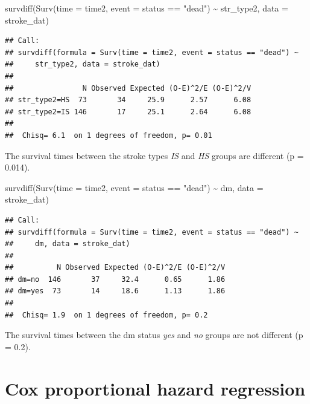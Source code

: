 \documentclass[
]{book}
\makeatletter
\newenvironment{Shaded}{\begin{snugshade}}{\end{snugshade}}
\newcommand{\AttributeTok}[1]{\textcolor[rgb]{0.61,0.61,0.61}{#1}}
\newcommand{\FunctionTok}[1]{\textcolor[rgb]{0,0,0}{#1}}
\newcommand{\NormalTok}[1]{#1}
\newcommand{\SpecialCharTok}[1]{\textcolor[rgb]{0,0,0}{#1}}
\newcommand{\StringTok}[1]{\textcolor[rgb]{0.5,0.5,0.5}{#1}}
\newenvironment{kframe}{%
\medskip{}
\setlength{\fboxsep}{.8em}
 \def\at@end@of@kframe{}%
 \ifinner\ifhmode%
  \def\at@end@of@kframe{\end{minipage}}%
  \begin{minipage}{\columnwidth}%
 \fi\fi%
 \def\FrameCommand##1{\hskip\@totalleftmargin \hskip-\fboxsep
 \colorbox{shadecolor}{##1}\hskip-\fboxsep
     \hskip-\linewidth \hskip-\@totalleftmargin \hskip\columnwidth}%
 \MakeFramed {\advance\hsize-\width
   \@totalleftmargin\z@ \linewidth\hsize
   \@setminipage}}%
 {\par\unskip\endMakeFramed%
 \at@end@of@kframe}
\renewenvironment{Shaded}{\begin{kframe}}{\end{kframe}}
\makeatother
\begin{document}
\begin{Shaded}
\begin{Highlighting}[]
\FunctionTok{survdiff}\NormalTok{(}\FunctionTok{Surv}\NormalTok{(}\AttributeTok{time =}\NormalTok{ time2, }\AttributeTok{event =}\NormalTok{ status }\SpecialCharTok{==} \StringTok{"dead"}\NormalTok{) }\SpecialCharTok{\textasciitilde{}}\NormalTok{ str\_type2, }\AttributeTok{data =}\NormalTok{ stroke\_dat)}
\end{Highlighting}
\end{Shaded}

\begin{verbatim}
## Call:
## survdiff(formula = Surv(time = time2, event = status == "dead") ~ 
##     str_type2, data = stroke_dat)
## 
##                N Observed Expected (O-E)^2/E (O-E)^2/V
## str_type2=HS  73       34     25.9      2.57      6.08
## str_type2=IS 146       17     25.1      2.64      6.08
## 
##  Chisq= 6.1  on 1 degrees of freedom, p= 0.01
\end{verbatim}

The survival times between the stroke types \emph{IS} and \emph{HS} groups are different (p = 0.014).

\begin{Shaded}
\begin{Highlighting}[]
\FunctionTok{survdiff}\NormalTok{(}\FunctionTok{Surv}\NormalTok{(}\AttributeTok{time =}\NormalTok{ time2, }\AttributeTok{event =}\NormalTok{ status }\SpecialCharTok{==} \StringTok{"dead"}\NormalTok{) }\SpecialCharTok{\textasciitilde{}}\NormalTok{ dm, }\AttributeTok{data =}\NormalTok{ stroke\_dat)}
\end{Highlighting}
\end{Shaded}

\begin{verbatim}
## Call:
## survdiff(formula = Surv(time = time2, event = status == "dead") ~ 
##     dm, data = stroke_dat)
## 
##          N Observed Expected (O-E)^2/E (O-E)^2/V
## dm=no  146       37     32.4      0.65      1.86
## dm=yes  73       14     18.6      1.13      1.86
## 
##  Chisq= 1.9  on 1 degrees of freedom, p= 0.2
\end{verbatim}

The survival times between the dm status \emph{yes} and \emph{no} groups are not different (p = 0.2).

\hypertarget{cox-proportional-hazard-regression}{%
\section{Cox proportional hazard regression}\label{cox-proportional-hazard-regression}}
\end{document}
